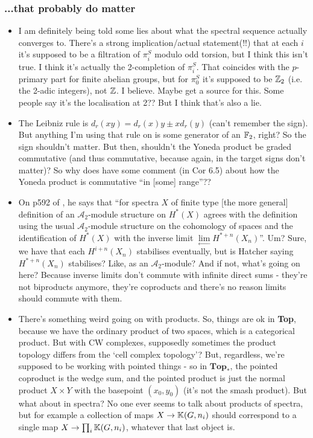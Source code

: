 \documentclass{MetricNotes2023}
\def\bb{\ensuremath\mathbb}
\def\inte{\ensuremath\mathbb{Z}}
\def\A{\ensuremath{\mathscr{A}_2}}
\begin{document}
\subsubsection{...that probably do matter}\label{2504011259timeforlunchithink}

\begin{itemize}
\item I am definitely being told some lies about what the spectral sequence actually converges to. There's a strong implication/actual statement(!!) that at each \(i\) it's supposed to be a filtration of \(\pi_i^S\) modulo odd torsion, but I think this isn't true. I think it's actually the 2-completion of \(\pi_i^S\). That coincides with the \(p\)-primary part for finite abelian groups, but for \(\pi_0^S\) it's supposed to be \(\inte_2\) (i.e. the 2-adic integers), not \(\inte\). I believe. Maybe get a source for this. Some people say it's the localisation at 2?? But I think that's also a lie. 

\item The Leibniz rule is \(d_r(xy)=d_r(x)y\pm xd_r(y)\) (can't remember the sign). But anything I'm using that rule on is some generator of an \(\bb{F}_2\), right? So the sign shouldn't matter. But then, shouldn't the Yoneda product be graded commutative (and thus commutative, because again, in the target signs don't matter)? So why does \autocite{ass} have some comment (in Cor 6.5) about how the Yoneda product is commutative ``in [some] range''?? 

\item On p592 of \autocite{hatcher5}, he says that ``for spectra \(X\) of finite type [the more general] definition of an \(\A\)-module structure on \(H^*(X)\) agrees with the definition using the usual \(\A\)-module structure on the cohomology of spaces and the identification of \(H^*(X)\) with the inverse limit \(\lim\limits_{\leftarrow}H^{*+n}(X_n)\)''. Um? Sure, we have that each \(H^{i+n}(X_n)\) stabilises eventually, but is Hatcher saying \(H^{*+n}(X_n)\) stabilises? Like, as an \(\A\)-module? And if not, what's going on here? Because inverse limits don't commute with infinite direct sums - they're not biproducts anymore, they're coproducts and there's no reason limits should commute with them. 

\item There's something weird going on with products. So, things are ok in \textbf{Top}, because we have the ordinary product of two spaces, which is a categorical product. But with CW complexes, supposedly sometimes the product topology differs from the `cell complex topology'? But, regardless, we're supposed to be working with pointed things - so in \(\textbf{Top}_*\), the pointed coproduct is the wedge sum, and the pointed product is just the normal product \(X\times Y\) with the basepoint \((x_0,y_0)\) (it's not the smash product). But what about in spectra? No one ever seems to talk about products of spectra, but for example a collection of maps \(X\to \bb{K}(G,n_i)\) should correspond to a single map \(X\to \prod_i \bb{K}(G,n_i)\), whatever that last object is. 


\end{itemize}
\end{document}

